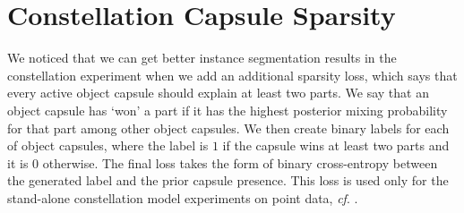 \section{Constellation Capsule Sparsity}
\label{app:constellation_caps_sparsity}

We noticed that we can get better instance segmentation results in the constellation experiment when we add an additional sparsity loss, which says that every active object capsule should explain at least two parts.
We say that an object capsule has `won' a part if it has the highest posterior mixing probability for that part among other object capsules.
We then create binary labels for each of object capsules, where the label is $1$ if the capsule wins at least two parts and it is $0$ otherwise.
The final loss takes the form of binary cross-entropy between the generated label and the prior capsule presence. This loss is used only for the stand-alone constellation model experiments on point data, \textit{cf}. .